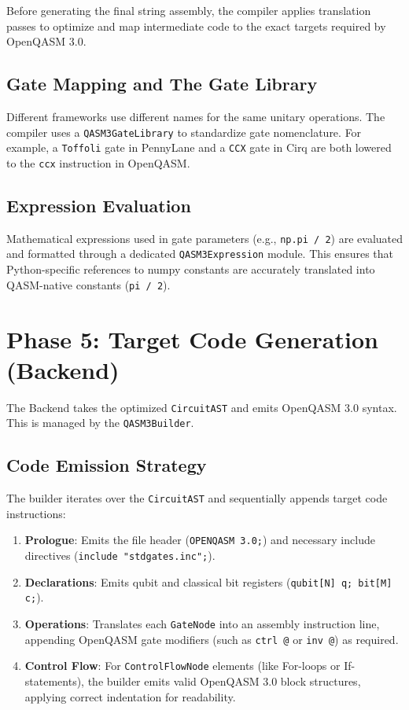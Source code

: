 \documentclass[12pt, a4paper]{article}
\begin{document}
Before generating the final string assembly, the compiler applies translation passes to optimize and map intermediate code to the exact targets required by OpenQASM 3.0.

\subsection{Gate Mapping and The Gate Library}
Different frameworks use different names for the same unitary operations. The compiler uses a \texttt{QASM3GateLibrary} to standardize gate nomenclature. For example, a \texttt{Toffoli} gate in PennyLane and a \texttt{CCX} gate in Cirq are both lowered to the \texttt{ccx} instruction in OpenQASM.

\subsection{Expression Evaluation}
Mathematical expressions used in gate parameters (e.g., \texttt{np.pi / 2}) are evaluated and formatted through a dedicated \texttt{QASM3Expression} module. This ensures that Python-specific references to numpy constants are accurately translated into QASM-native constants (\texttt{pi / 2}).

\section{Phase 5: Target Code Generation (Backend)}
\label{sec:backend}

The Backend takes the optimized \texttt{CircuitAST} and emits OpenQASM 3.0 syntax. This is managed by the \texttt{QASM3Builder}.

\subsection{Code Emission Strategy}
The builder iterates over the \texttt{CircuitAST} and sequentially appends target code instructions:
\begin{enumerate}
    \item \textbf{Prologue}: Emits the file header (\texttt{OPENQASM 3.0;}) and necessary include directives (\texttt{include "stdgates.inc";}).
    \item \textbf{Declarations}: Emits qubit and classical bit registers (\texttt{qubit[N] q; bit[M] c;}).
    \item \textbf{Operations}: Translates each \texttt{GateNode} into an assembly instruction line, appending OpenQASM gate modifiers (such as \texttt{ctrl @} or \texttt{inv @}) as required.
    \item \textbf{Control Flow}: For \texttt{ControlFlowNode} elements (like For-loops or If-statements), the builder emits valid OpenQASM 3.0 block structures, applying correct indentation for readability.
\end{enumerate}
\end{document}
